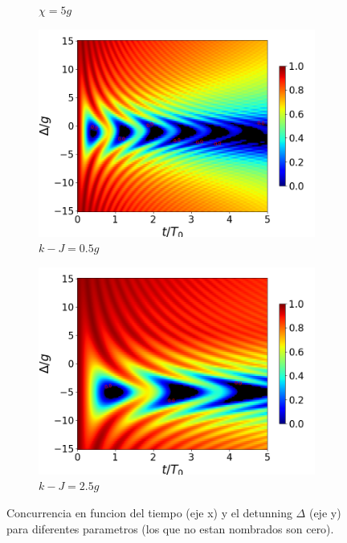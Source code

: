 \begin{figure}[h]
\begin{subfigure}{0.49\textwidth}
        \caption{$\chi=5g$}
        \label{fig4:concu detunning x2}
    \end{subfigure}
    \vfill
    \begin{subfigure}{0.49\textwidth}
        \includegraphics[width=\textwidth]{figuras/ch4/concu/delta/eg0+ge0 k=0.5g x=0.0g J=0.0g gamma=0.25g concu delta dis.png}
        \caption{$k-J=0.5g$}
        \label{fig4:concu detunning k1}
    \end{subfigure}
    \hfill
    \begin{subfigure}{0.49\textwidth}
        \includegraphics[width=\textwidth]{figuras/ch4/concu/delta/eg0+ge0 k=2.5g x=0.0g J=0.0g gamma=0.25g concu delta dis.png}
        \caption{$k-J=2.5g$}
        \label{fig4:concu detunning k2}
    \end{subfigure}
    \caption{Concurrencia en funcion del tiempo (eje x) y el detunning $\Delta$ (eje y) para diferentes parametros (los que no estan nombrados son cero).}
    \label{fig4:concu detunning 0 params}
\end{figure}
